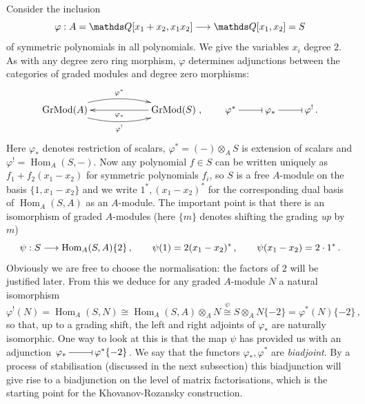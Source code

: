 \documentclass{compositio}
\theoremstyle{definition}
\numberwithin{equation}{section}
\def\Hom{\operatorname{Hom}}
\def\Grmodd{\operatorname{GrMod}}
\begin{document}
Consider the inclusion
\[
\varphi: A = \QQ[x_1 + x_2, x_1 x_2] \lto \QQ[x_1,x_2] = S
\]
of symmetric polynomials in all polynomials. We give the variables $x_i$ degree $2$. As with any degree zero ring morphism, $\varphi$ determines adjunctions between the categories of graded modules and degree zero morphisms: 
\[
\xymatrix@C+3pc{
\Grmodd(A) \ar@/^1pc/[r]^-{\varphi^*} \ar@/_1pc/[r]_-{\varphi^!} & \Grmodd(S) \ar[l]^-{\varphi_*}
}, \qquad
\xymatrix{
\varphi^* \ar@{-|}[r] & \varphi_* \ar@{-|}[r] & \varphi^!\,.
}
\]
Here $\varphi_*$ denotes restriction of scalars, $\varphi^* = (-) \otimes_A S$ is extension of scalars and $\varphi^! = \Hom_A(S, -)$. Now any polynomial $f \in S$ can be written uniquely as $f_1 + f_2(x_1-x_2)$ for symmetric polynomials $f_i$, so $S$ is a free $A$-module on the basis $\{1, x_1 - x_2\}$ and we write $1^*, (x_1-x_2)^*$ for the corresponding dual basis of $\Hom_A(S,A)$ as an $A$-module. The important point is that there is an isomorphism of graded $A$-modules (here $\{ m \}$ denotes shifting the grading \emph{up} by $m$)
\[
\psi: S \lto \Hom_A(S,A)\{2\} \, , \qquad \psi(1) = 2(x_1-x_2)^* \, , \qquad \psi(x_1-x_2) = 2 \cdot 1^* \, .
\]
Obviously we are free to choose the normalisation: the factors of $2$ will be justified later. From this we deduce for any graded $A$-module $N$ a natural isomorphism 
\[
\varphi^!(N) = \Hom_A(S,N) \cong \Hom_A(S,A) \otimes_A N \stackrel{\psi}{\cong} S \otimes_A N \{-2\} = \varphi^*(N)\{-2\} \, ,
\]
so that, up to a grading shift, the left and right adjoints of $\varphi_*$ are naturally isomorphic. One way to look at this is that the map $\psi$ has provided us with an adjunction $\xymatrix@1{\varphi_*\, \ar@{-|}[r] & \,\varphi^*\{-2\}}$. We say that the functors $\varphi_*, \varphi^*$ are \emph{biadjoint}. By a process of stabilisation (discussed in the next subsection) this biadjunction will give rise to a biadjunction on the level of matrix factorisations, which is the starting point for the Khovanov-Rozansky construction.
\end{document}
